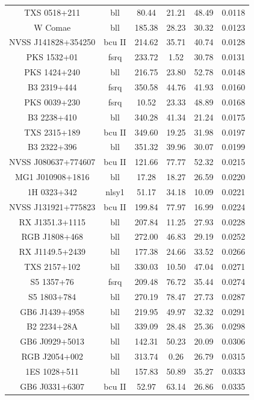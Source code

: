 \begin{center}
\begin{longtable}{||cccccc||}
TXS 0518+211 &  bll  & 80.44 & 21.21 & 48.49 & 0.0118  \\
W Comae &  bll  & 185.38 & 28.23 & 30.32 & 0.0123  \\
NVSS J141828+354250 &  bcu II  & 214.62 & 35.71 & 40.74 & 0.0128  \\
PKS 1532+01 &  fsrq  & 233.72 & 1.52 & 30.78 & 0.0131  \\
PKS 1424+240 &  bll  & 216.75 & 23.80 & 52.78 & 0.0148  \\
B3 2319+444 &  fsrq  & 350.58 & 44.76 & 41.93 & 0.0160  \\
PKS 0039+230 &  fsrq  & 10.52 & 23.33 & 48.89 & 0.0168  \\
B3 2238+410 &  bll  & 340.28 & 41.34 & 21.24 & 0.0175  \\
TXS 2315+189 &  bcu II  & 349.60 & 19.25 & 31.98 & 0.0197  \\
B3 2322+396 &  bll  & 351.32 & 39.96 & 30.07 & 0.0199  \\
NVSS J080637+774607 &  bcu II  & 121.66 & 77.77 & 52.32 & 0.0215  \\
MG1 J010908+1816 &  bll  & 17.28 & 18.27 & 26.59 & 0.0220  \\
1H 0323+342 &  nlsy1  & 51.17 & 34.18 & 10.09 & 0.0221  \\
NVSS J131921+775823 &  bcu II  & 199.84 & 77.97 & 16.99 & 0.0224  \\
RX J1351.3+1115 &  bll  & 207.84 & 11.25 & 27.93 & 0.0228  \\
RGB J1808+468 &  bll  & 272.00 & 46.83 & 29.19 & 0.0252  \\
RX J1149.5+2439 &  bll  & 177.38 & 24.66 & 33.52 & 0.0266  \\
TXS 2157+102 &  bll  & 330.03 & 10.50 & 47.04 & 0.0271  \\
S5 1357+76 &  fsrq  & 209.48 & 76.72 & 35.44 & 0.0274  \\
S5 1803+784 &  bll  & 270.19 & 78.47 & 27.73 & 0.0287  \\
GB6 J1439+4958 &  bll  & 219.95 & 49.97 & 32.32 & 0.0291  \\
B2 2234+28A &  bll  & 339.09 & 28.48 & 25.36 & 0.0298  \\
GB6 J0929+5013 &  bll  & 142.31 & 50.23 & 20.09 & 0.0306  \\
RGB J2054+002 &  bll  & 313.74 & 0.26 & 26.79 & 0.0315  \\
1ES 1028+511 &  bll  & 157.83 & 50.89 & 35.27 & 0.0333  \\
GB6 J0331+6307 &  bcu II  & 52.97 & 63.14 & 26.86 & 0.0335  \\

\end{longtable}
\end{center}
